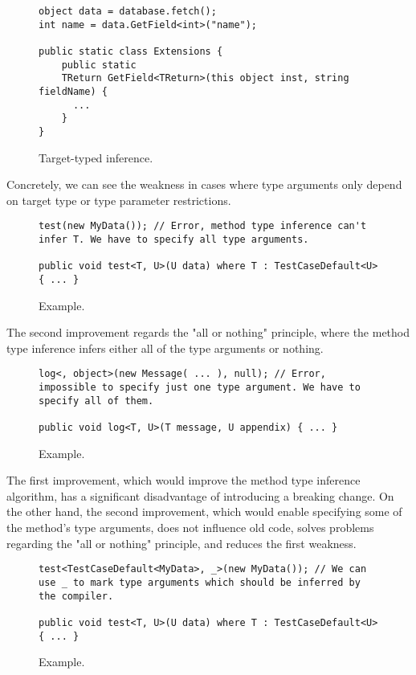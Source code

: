 \begin{figure}[h]
\begin{lstlisting}[style=csharp]
object data = database.fetch();
int name = data.GetField<int>("name");

public static class Extensions {
    public static 
    TReturn GetField<TReturn>(this object inst, string fieldName) { 
      ... 
    }
}
\end{lstlisting}
\caption{Target-typed inference.}
\label{img27:usecase1}
\end{figure}
\par
Concretely, we can see the weakness in cases where type arguments only depend on target type or type parameter restrictions.
\begin{figure}[h]
\begin{lstlisting}[style=csharp]
test(new MyData()); // Error, method type inference can't infer T. We have to specify all type arguments.

public void test<T, U>(U data) where T : TestCaseDefault<U> { ... }
\end{lstlisting}
\caption{Example.}
\label{img28}
\end{figure}
\par
The second improvement regards the "all or nothing" principle, where the method type inference infers either all of the type arguments or nothing.
\begin{figure}[h]
\begin{lstlisting}[style=csharp]
log<, object>(new Message( ... ), null); // Error, impossible to specify just one type argument. We have to specify all of them. 

public void log<T, U>(T message, U appendix) { ... }
\end{lstlisting}
\caption{Example.}
\label{img29}
\end{figure}
\par
The first improvement, which would improve the method type inference algorithm, has a significant disadvantage of introducing a breaking change. 
On the other hand, the second improvement, which would enable specifying some of the method's type arguments, does not influence old code, solves problems regarding the "all or nothing" principle, and reduces the first weakness.
\begin{figure}[h]
\begin{lstlisting}[style=csharp]
test<TestCaseDefault<MyData>, _>(new MyData()); // We can use _ to mark type arguments which should be inferred by the compiler.

public void test<T, U>(U data) where T : TestCaseDefault<U> { ... }
\end{lstlisting}
\caption{Example.}
\label{img30}
\end{figure}
